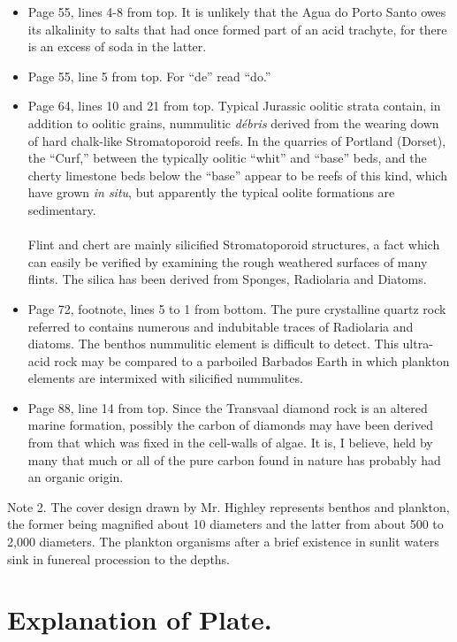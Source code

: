 \documentclass[a4paper, 12pt, oneside]{article}
\begin{document}
\begin{itemize}
    \item Page 55, lines 4-8 from top. It is unlikely that the Agua do Porto Santo owes its alkalinity to salts that had once formed part of an acid trachyte, for there is an excess of soda in the latter.

    \item Page 55, line 5 from top. For ``de'' read ``do.''

    \item Page 64, lines 10 and 21 from top. Typical Jurassic oolitic strata contain, in addition to oolitic grains, nummulitic \emph{débris} derived from the wearing down of hard chalk-like Stromatoporoid reefs. In the quarries of Portland (Dorset), the ``Curf,'' between the typically oolitic ``whit'' and ``base'' beds, and the cherty limestone beds below the ``base'' appear to be reefs of this kind, which have grown \emph{in situ}, but apparently the typical oolite formations are sedimentary.\\ \\ Flint and chert are mainly silicified Stromatoporoid structures, a fact which can easily be verified by examining the rough weathered surfaces of many flints. The silica has been derived from Sponges, Radiolaria and Diatoms.

    \item Page 72, footnote, lines 5 to 1 from bottom. The pure crystalline quartz rock referred to contains numerous and indubitable traces of Radiolaria and diatoms. The benthos nummulitic element is difficult to detect. This ultra-acid rock may be compared to a parboiled Barbados Earth in which plankton elements are intermixed with silicified nummulites.

    \item Page 88, line 14 from top. Since the Transvaal diamond rock is an altered marine formation, possibly the carbon of diamonds may have been derived from that which was fixed in the cell-walls of algae. It is, I believe, held by many that much or all of the pure carbon found in nature has probably had an organic origin.
\end{itemize}
Note 2. The cover design drawn by Mr. Highley represents benthos and plankton, the former being magnified about 10 diameters and the latter from about 500 to 2,000 diameters. The plankton organisms after a brief existence in sunlit waters sink in funereal procession to the depths.
\clearpage
\section{Explanation of Plate.}
\end{document}

